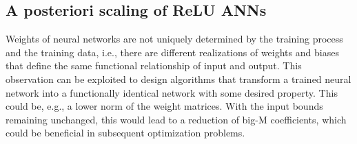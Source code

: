 \subsection{A posteriori scaling of ReLU ANNs} \label{sec:scaling}
Weights of neural networks are not uniquely determined by the training process and the training data, i.e., there are different realizations of weights and biases that define the same functional relationship of input and output. This observation can be exploited to design algorithms that transform a trained neural network into a functionally identical network with some desired property. This could be, e.g., a lower norm of the weight matrices. With the input bounds remaining unchanged, this would lead to a reduction of big-M coefficients, which could be beneficial in subsequent optimization problems.

